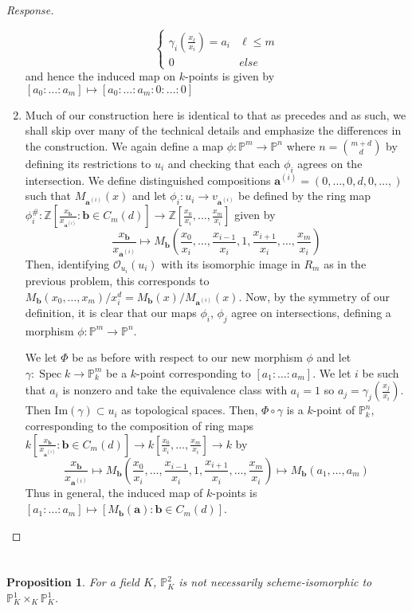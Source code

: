\documentclass[english,letter,doublesided]{article}
\renewcommand\vec{\mathbf}
\DeclareMathOperator{\spec}{Spec}
\newcommand{\ZZ}{\mathbb{Z}}
\newcommand{\OO}{\mathcal{O}}
\newcommand{\PP}{\mathbb{P}}
\newcommand{\prob}[1]{\setcounter{section}{#1-1}\section{}}
\newtheorem*{prop*}{Proposition}
\theoremstyle{remark}
\theoremstyle{definition}
\newcommand{\im}{\mathrm{Im}}
\newcommand{\fv}[2]{\frac{x_{#1}}{x_{#2}}}
\newcommand{\va}{\vec{a}}
\newcommand{\vai}[1]{\va^{(#1)}}
\begin{document}
\begin{proof}[Response]
\begin{enumerate}[label=\textit{(\roman*)}]
\begin{equation*}
\begin{cases}
\gamma_i(	\fv{\ell}{i})=a_i&\ell\leq m\\
	0&else
	\end{cases}
\end{equation*}
and hence the induced map on $k$-points is given by $[a_0:\hdots:a_m]\mapsto [a_0:\hdots:a_m:0:\hdots:0]$
	\item Much of our construction here is identical to that as precedes and as such, we shall skip over many of the technical details and emphasize the differences in the construction. We again define a map $\phi:\PP^m\to \PP^n$ where $n={m+d\choose d}$ by defining its restrictions to $u_i$ and checking that each $\phi_i$ agrees on the intersection. We define distinguished compositions $\vec{a}^{(i)}=(0,\hdots,0,d,0,\hdots,)$ such that $M_{\vai{i}}(x)$ and let $\phi_i:u_i\to v_{\vec{a}^{(i)}}$ be defined by the ring map $\phi_i^\#:\ZZ[\fv{\vec{b}}{\vai{i}}:\vec{b}\in C_m(d)]\to \ZZ[\fv{0}{i},\hdots,\fv{m}{i}]$ given by $$\fv{\vec{b}}{\vai{i}}\mapsto M_{\vec{b}}\left(\fv{0}{i},\hdots,\fv{i-1}{i},1,\fv{i+1}{i},\hdots,\fv{m}{i}\right)$$
	Then, identifying $\OO_{u_i}(u_i)$ with its isomorphic image in $R_m$ as in the previous problem, this corresponds to $M_{\vec{b}}(x_0,\hdots,x_m)/x_i^d=M_{\vec{b}}(x)/M_{\vec{a}^{(i)}}(x)$. Now, by the symmetry of our definition, it is clear that our maps $\phi_i$, $\phi_j$ agree on intersections, defining a morphism $\phi: \PP^m\to \PP^n$. 
	
	We let $\Phi$ be as before with respect to our new morphism $\phi$ and let $\gamma:\spec k\to \PP^m_k$ be a $k$-point corresponding to $[a_1:\hdots:a_m]$. We let $i$ be such that $a_i$ is nonzero and take the equivalence class with $a_i=1$ so $a_j=\gamma_j(\fv{j}{i})$. Then $\im(\gamma)\subset u_i$ as topological spaces. Then, $\Phi\circ \gamma$ is a $k$-point of $\PP^n_k$, corresponding to the composition of ring maps $k[\fv{\vec{b}}{\vai{i}}:\vec{b}\in C_m(d)]\to k[\fv{0}{i},\hdots,\fv{m}{i}]\to k$ by
	\begin{equation}
		\fv{\vec{b}}{\vai{i}}\mapsto M_\vec{b}\left(\fv{0}{i},\hdots,\fv{i-1}{i},1,\fv{i+1}{i},\hdots,\fv{m}{i}\right)\mapsto M_\vec{b}(a_1,\hdots,a_m)
	\end{equation}
	Thus in general, the induced map of $k$-points is $[a_1:\hdots:a_m]\mapsto [M_\vec{b}(\vec{a}):\vec{b}\in C_m(d)]$.
\end{enumerate}
\end{proof}
\prob{4}
\begin{prop*} For a field $K$, 
$\PP^2_K$ is not necessarily scheme-isomorphic to $\PP_K^1\times_{K}\PP_K^1$.
\end{prop*}
\end{document}
